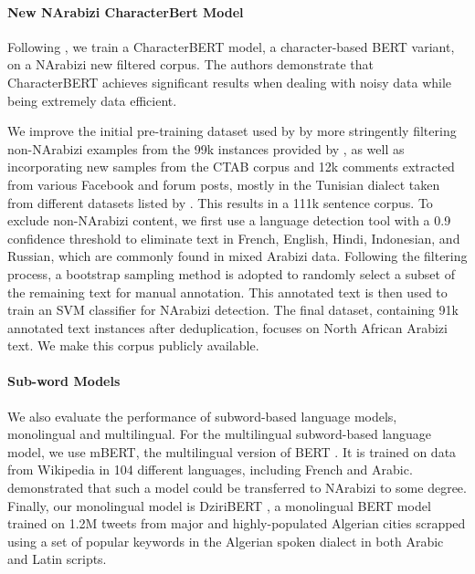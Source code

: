 \documentclass[11pt]{article}
\begin{document}
\paragraph{New NArabizi CharacterBert Model}
Following \citet{riabi-etal-2021-character}, we train a CharacterBERT \cite{el-boukkouri-etal-2020-CharacterBERT} model, a character-based BERT variant, on a NArabizi new filtered corpus. The authors demonstrate that CharacterBERT achieves significant results when dealing with noisy data while being extremely data efficient. 
 
We improve the initial pre-training dataset used by \citet{riabi-etal-2021-character} by more stringently filtering non-NArabizi examples from the 99k instances provided by \citet{seddah-etal-2020-building}, as well as incorporating new samples from the CTAB corpus \cite{amina_amara_2021_4780941} and 12k comments extracted from various Facebook and forum posts, mostly in the Tunisian dialect taken from different datasets listed by \citet{younes2020language}. This results in a 111k sentence corpus. To exclude non-NArabizi content, we first use a language detection tool \cite{nakatani2010langdetect} with a 0.9 confidence threshold to eliminate text in French, English, Hindi, Indonesian, and Russian, which are commonly found in mixed Arabizi data. Following the filtering process, a bootstrap sampling method is adopted to randomly select a subset of the remaining text for manual annotation. This annotated text is then used to train an SVM classifier for NArabizi detection. The final dataset, containing 91k annotated text instances after deduplication, focuses on North African Arabizi text. We make this corpus publicly available.


\paragraph{Sub-word Models}
We also evaluate the performance of subword-based language models, monolingual and multilingual. For the multilingual subword-based language model, we use mBERT, the multilingual version of BERT \cite{devlin2018bert}. It is trained on data from Wikipedia in 104 different languages, including French and Arabic. \citet{muller2020can} demonstrated that such a model could be transferred to NArabizi to some degree. Finally, our monolingual model is DziriBERT \cite{abdaoui2021DziriBERT}, a monolingual BERT model trained on 1.2M tweets from major and highly-populated Algerian cities scrapped using a set of popular keywords in the Algerian spoken dialect in both Arabic and Latin scripts.
\end{document}
